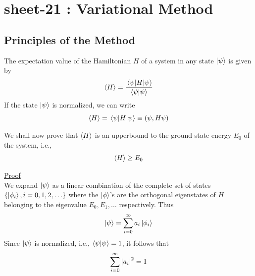 \chapter{sheet-21 : Variational Method}

\section{Principles of the Method}
The expectation value of the Hamiltonian $H$ of a system in any state $\ket{\psi}$ is given by
\begin{equation}
\expval{H} = \frac{\expval{H}{\psi}}{\braket{\psi}{\psi}}
\label{chapter21.eqn1-principle}
\end{equation}
If the state $\ket{\psi}$ is normalized, we can write
\begin{equation}
\expval{H} = \expval{H}{\psi} \equiv \qty(\psi, H \psi)
\label{chapter21.eqn2-principle}
\end{equation}

We shall now prove that $\expval{H}$ is an upperbound to the ground state energy $E_0$ of the system, i.e.,
\begin{equation}
\expval{H} \geq E_0
\label{chapter21.eqn3-principle}
\end{equation}

\underline{Proof}\\
	We expand $\ket{\psi}$ as a linear combination of the complete set of states $\{\ket{\phi_i}, i=0,1,2,\ldots\}$ where the $\ket{\phi}$'s are the orthogonal eigenstates of $H$ belonging to the eigenvalue $E_0, E_1, \ldots$ respectively. Thus
	\begin{equation}
		\ket{\psi} = \sum_{i=0}^{\infty} a_i \ket{\phi_i}
		\label{chapter21.eqn4-principle}
	\end{equation}
	Since $\ket{\psi}$ is normalized, i.e., $\braket{\psi}{\psi} = 1$, it follows that
	\begin{equation}
		\sum_{i=0}^{\infty} \abs{a_i}^2 = 1
		\label{chapter21.eqn5-principle}
	\end{equation}
	
